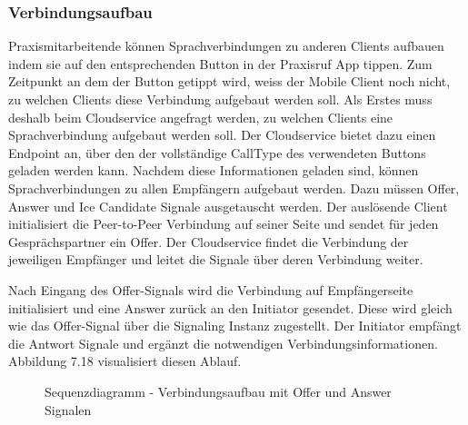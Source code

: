 \clearpage

\subsubsection{Verbindungsaufbau}

Praxismitarbeitende können Sprachverbindungen zu anderen Clients aufbauen indem sie auf den entsprechenden Button in der Praxisruf App tippen.
Zum Zeitpunkt an dem der Button getippt wird, weiss der Mobile Client noch nicht, zu welchen Clients diese Verbindung aufgebaut werden soll.
Als Erstes muss deshalb beim Cloudservice angefragt werden, zu welchen Clients eine Sprachverbindung aufgebaut werden soll.
Der Cloudservice bietet dazu einen Endpoint an, über den der vollständige CallType des verwendeten Buttons geladen werden kann.
Nachdem diese Informationen geladen sind, können Sprachverbindungen zu allen Empfängern aufgebaut werden.
Dazu müssen Offer, Answer und Ice Candidate Signale ausgetauscht werden.
Der auslösende Client initialisiert die Peer-to-Peer Verbindung auf seiner Seite und sendet für jeden Gesprächspartner ein Offer.
Der Cloudservice findet die Verbindung der jeweiligen Empfänger und leitet die Signale über deren Verbindung weiter.

Nach Eingang des Offer-Signals wird die Verbindung auf Empfängerseite initialisiert und eine Answer zurück an den Initiator gesendet.
Diese wird gleich wie das Offer-Signal über die Signaling Instanz zugestellt.
Der Initiator empfängt die Antwort Signale und ergänzt die notwendigen Verbindungsinformationen.
Abbildung 7.18 visualisiert diesen Ablauf.

\begin{figure}[h]
    \centering
    \begin{minipage}[b]{0.9\textwidth}
        \caption{Sequenzdiagramm - Verbindungsaufbau mit Offer und Answer Signalen}
    \end{minipage}
\end{figure}

